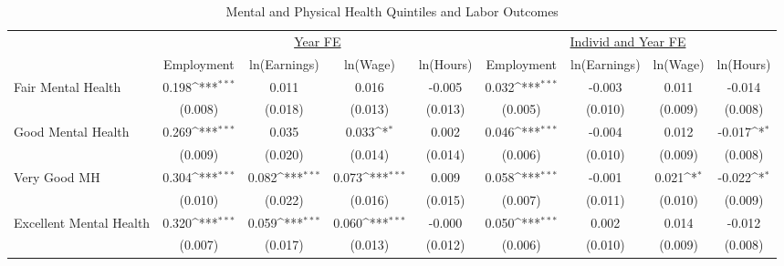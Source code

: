 \def\sym#1{\ifmmode^{#1}\else\(^{#1}\)\fi}
\begin{table}
\center\caption*{Mental and Physical Health Quintiles and Labor Outcomes}
\footnotesize
\begin{tabular}{l*{8}{c}}
                    &\multicolumn{4}{c}{\underline{Year FE}}                                                &\multicolumn{4}{c}{\underline{Individ and Year FE}}                                    \\\cmidrule(lr){2-5}\cmidrule(lr){6-9}
                    &\multicolumn{1}{c}{Employment}&\multicolumn{1}{c}{ln(Earnings)}&\multicolumn{1}{c}{ln(Wage)}&\multicolumn{1}{c}{ln(Hours)}&\multicolumn{1}{c}{Employment}&\multicolumn{1}{c}{ln(Earnings)}&\multicolumn{1}{c}{ln(Wage)}&\multicolumn{1}{c}{ln(Hours)}\\
\midrule
Fair Mental Health  &       0.198\sym{***}&       0.011         &       0.016         &      -0.005         &       0.032\sym{***}&      -0.003         &       0.011         &      -0.014         \\
                    &     (0.008)         &     (0.018)         &     (0.013)         &     (0.013)         &     (0.005)         &     (0.010)         &     (0.009)         &     (0.008)         \\
Good Mental Health  &       0.269\sym{***}&       0.035         &       0.033\sym{*}  &       0.002         &       0.046\sym{***}&      -0.004         &       0.012         &      -0.017\sym{*}  \\
                    &     (0.009)         &     (0.020)         &     (0.014)         &     (0.014)         &     (0.006)         &     (0.010)         &     (0.009)         &     (0.008)         \\
Very Good MH        &       0.304\sym{***}&       0.082\sym{***}&       0.073\sym{***}&       0.009         &       0.058\sym{***}&      -0.001         &       0.021\sym{*}  &      -0.022\sym{*}  \\
                    &     (0.010)         &     (0.022)         &     (0.016)         &     (0.015)         &     (0.007)         &     (0.011)         &     (0.010)         &     (0.009)         \\
Excellent Mental Health&       0.320\sym{***}&       0.059\sym{***}&       0.060\sym{***}&      -0.000         &       0.050\sym{***}&       0.002         &       0.014         &      -0.012         \\
                    &     (0.007)         &     (0.017)         &     (0.013)         &     (0.012)         &     (0.006)         &     (0.010)         &     (0.009)         &     (0.008)         \\

\end{tabular}
\end{table}
